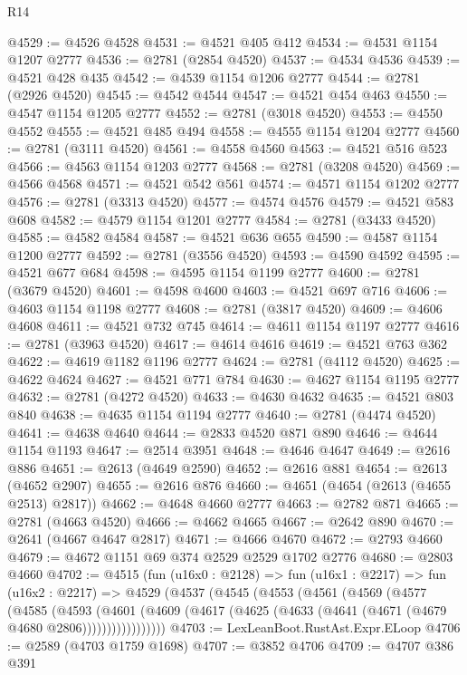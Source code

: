\begin{lexlean}{R14}
\begin{coremodule}
@4529 := @4526 @4528
@4531 := @4521 @405 @412
@4534 := @4531 @1154 @1207 @2777
@4536 := @2781 (@2854 @4520)
@4537 := @4534 @4536
@4539 := @4521 @428 @435
@4542 := @4539 @1154 @1206 @2777
@4544 := @2781 (@2926 @4520)
@4545 := @4542 @4544
@4547 := @4521 @454 @463
@4550 := @4547 @1154 @1205 @2777
@4552 := @2781 (@3018 @4520)
@4553 := @4550 @4552
@4555 := @4521 @485 @494
@4558 := @4555 @1154 @1204 @2777
@4560 := @2781 (@3111 @4520)
@4561 := @4558 @4560
@4563 := @4521 @516 @523
@4566 := @4563 @1154 @1203 @2777
@4568 := @2781 (@3208 @4520)
@4569 := @4566 @4568
@4571 := @4521 @542 @561
@4574 := @4571 @1154 @1202 @2777
@4576 := @2781 (@3313 @4520)
@4577 := @4574 @4576
@4579 := @4521 @583 @608
@4582 := @4579 @1154 @1201 @2777
@4584 := @2781 (@3433 @4520)
@4585 := @4582 @4584
@4587 := @4521 @636 @655
@4590 := @4587 @1154 @1200 @2777
@4592 := @2781 (@3556 @4520)
@4593 := @4590 @4592
@4595 := @4521 @677 @684
@4598 := @4595 @1154 @1199 @2777
@4600 := @2781 (@3679 @4520)
@4601 := @4598 @4600
@4603 := @4521 @697 @716
@4606 := @4603 @1154 @1198 @2777
@4608 := @2781 (@3817 @4520)
@4609 := @4606 @4608
@4611 := @4521 @732 @745
@4614 := @4611 @1154 @1197 @2777
@4616 := @2781 (@3963 @4520)
@4617 := @4614 @4616
@4619 := @4521 @763 @362
@4622 := @4619 @1182 @1196 @2777
@4624 := @2781 (@4112 @4520)
@4625 := @4622 @4624
@4627 := @4521 @771 @784
@4630 := @4627 @1154 @1195 @2777
@4632 := @2781 (@4272 @4520)
@4633 := @4630 @4632
@4635 := @4521 @803 @840
@4638 := @4635 @1154 @1194 @2777
@4640 := @2781 (@4474 @4520)
@4641 := @4638 @4640
@4644 := @2833 @4520 @871 @890
@4646 := @4644 @1154 @1193
@4647 := @2514 @3951
@4648 := @4646 @4647
@4649 := @2616 @886
@4651 := @2613 (@4649 @2590)
@4652 := @2616 @881
@4654 := @2613 (@4652 @2907)
@4655 := @2616 @876
@4660 := @4651 (@4654 (@2613 (@4655 @2513) @2817))
@4662 := @4648 @4660 @2777
@4663 := @2782 @871
@4665 := @2781 (@4663 @4520)
@4666 := @4662 @4665
@4667 := @2642 @890
@4670 := @2641 (@4667 @4647 @2817)
@4671 := @4666 @4670
@4672 := @2793 @4660
@4679 := @4672 @1151 @69 @374 @2529 @2529 @1702 @2776
@4680 := @2803 @4660
@4702 := @4515
    (fun (u16x0 : @2128) =>
    fun (u16x1 : @2217) =>
    fun (u16x2 : @2217) =>
    @4529
      (@4537
        (@4545
          (@4553
            (@4561
              (@4569
                (@4577
                  (@4585
                    (@4593
                      (@4601
                        (@4609
                          (@4617 (@4625 (@4633 (@4641 (@4671 (@4679 @4680 @2806)))))))))))))))))
@4703 := LexLeanBoot.RustAst.Expr.ELoop
@4706 := @2589 (@4703 @1759 @1698)
@4707 := @3852 @4706
@4709 := @4707 @386 @391

\end{coremodule}
\end{lexlean}
